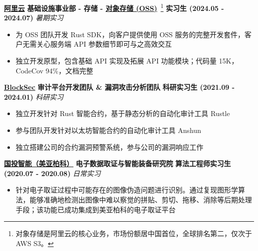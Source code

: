     \noindent \textbf{\href{https://www.aliyun.com}{阿里云}} \textbar{} \textbf{基础设施事业部 - 存储 -
    \href{https://www.aliyun.com/product/oss}{对象存储 (OSS)}}~\footnote{对象存储是阿里云的核心业务，市场份额居中国首位，全球排名第二，仅次于 AWS S3。}
    \textbar{} \textbf{实习生 (2024.05 - 2024.07)} \hfill \textsl{暑期实习}

    \begin{itemize}
        \item 为 OSS 团队开发 Rust SDK，向客户提供使用 OSS 服务的完整开发套件，客户无需关心服务端 API 参数细节即可与之高效交互
        \item 独立开发原型，包含基础 API 实现及拓展 API 功能模块；代码量 15K，CodeCov 94\%，文档完整
    \end{itemize}

    \noindent \textbf{\href{https://blocksec.com}{BlockSec}} \textbar{} \textbf{审计平台开发团队 \& 漏洞攻击分析团队} \textbar{}
    \textbf{科研实习生 (2021.09 - 2024.01)} \hfill \textsl{科研实习}

    \begin{itemize}
        \item 独立开发针对 Rust 智能合约，基于静态分析的自动化审计工具 Rustle
        \item 参与团队开发针对以太坊智能合约的自动化审计工具 Anshun
        \item 独立搭建公司的合约漏洞预警系统，参与公司的漏洞响应工作
    \end{itemize}

    \noindent \textbf{\href{https://300188.cn}{国投智能（美亚柏科）}} \textbar{} \textbf{电子数据取证与智能装备研究院} \textbar{}
    \textbf{算法工程师实习生 (2020.07 - 2020.08)} \hfill \textsl{日常实习}


    \begin{itemize}
        \item 针对电子取证过程中可能存在的图像伪造问题进行识别。通过复现图形学算法，能够准确地检测出图像中难以察觉的拼贴、剪切、拖移、消除等后期处理手段；该功能已成功集成到美亚柏科的电子取证平台
    \end{itemize}

\fi

\hfill

